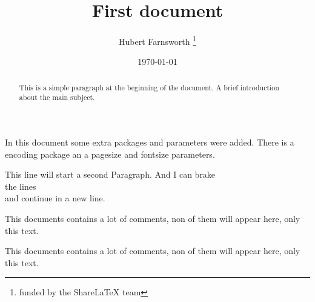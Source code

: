 \documentclass[12pt, letterpaper]{beamer}
\title{First document}
\author{Hubert Farnsworth \thanks{funded by the ShareLaTeX team}}
\date{\today}
\begin{document}
 
\maketitle
 
\begin{abstract}
This is a simple paragraph at the beginning of the 
document. A brief introduction about the main subject.
\end{abstract}
 
In this document some extra packages and parameters
were added. There is a encoding package
an a pagesize and fontsize parameters.
 
This line will start a second Paragraph. And I can
 brake\\ the lines \\and continue in a new line.

This documents contains a lot of comments, non of them
will appear here, only this text.
 
This documents contains a lot of comments, non of them
will appear here, only this text.
 
\begin{comment}
This text won't show up in the compiled pdf
this is just a multi-line comment. Useful
to, for instance, comment out slow-rendering
while working on the draft.
\end{comment}
 
\end{document}

